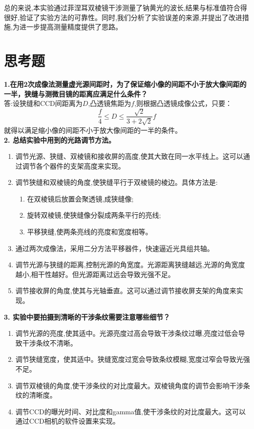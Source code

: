 \documentclass[UTF8]{ctexart}
\begin{document}
总的来说,本实验通过菲涅耳双棱镜干涉测量了钠黄光的波长,结果与标准值符合得很好,验证了实验方法的可靠性。同时,我们分析了实验误差的来源,并提出了改进措施,为进一步提高测量精度提供了思路。
\section{思考题}

\textbf{1.在用2次成像法测量虚光源间距时，为了保证缩小像的间距不小于放大像间距的一半，狭缝与测微目镜的距离应满足什么条件？} \\

答:设狭缝和CCD间距离为$D$,凸透镜焦距为$f$,则根据凸透镜成像公式，只要：
$$
\frac{f}{4} \leq  D \leq  \frac{\sqrt{2}}{3+2\sqrt{2}}f
$$
就得以满足缩小像的间距不小于放大像间距的一半的条件。
\\

\textbf{2. 总结实验中用到的光路调节方法。}
\begin{enumerate}
    \item 调节光源、狭缝、双棱镜和接收屏的高度,使其大致在同一水平线上。这可以通过调节各个器件的支架高度来实现。
    
    \item 调节狭缝和双棱镜的角度,使狭缝平行于双棱镜的棱边。具体方法是:
    \begin{enumerate}
        \item 在双棱镜后放置会聚透镜,成狭缝像;
        \item 旋转双棱镜,使狭缝像分裂成两条平行的亮线;
        \item 平移狭缝,使两条亮线的亮度和宽度相等。
    \end{enumerate}
    
    \item 通过两次成像法，采用二分方法平移器件，快速逼近光具组共轴。
    
    \item 调节光源与狭缝的距离,控制光源的角宽度。光源距离狭缝越远,光源的角宽度越小,相干性越好。但光源距离过远会导致光强不足。
    
    \item 调节接收屏的角度,使其与光轴垂直。这可以通过调节接收屏支架的角度来实现。

\end{enumerate}

\textbf{3. 实验中要拍摄到清晰的干涉条纹需要注意哪些细节？ }
\begin{enumerate}
    \item 调节光源的亮度,使其适中。光源亮度过高会导致干涉条纹过曝,亮度过低会导致干涉条纹不清晰。
    \item 调节狭缝宽度，使其适中。狭缝宽度过宽会导致条纹模糊,宽度过窄会导致光强不足。
    \item 调节双棱镜的角度,使干涉条纹的对比度最大。双棱镜角度的调节会影响干涉条纹的清晰度。
    \item 调节CCD的曝光时间、对比度和gamma值,使干涉条纹的对比度最大。这可以通过CCD相机的软件设置来实现。
\end{enumerate}
\end{document}
